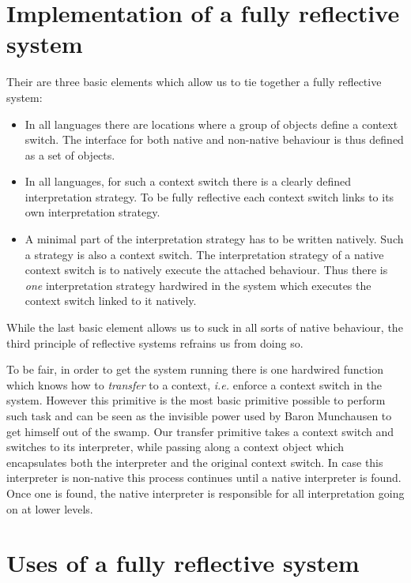 \documentclass{article}
\newcommand{\ie}{\emph{i.e.}\xspace}
\begin{document}
\section{Implementation of a fully reflective system}
Their are three basic elements which allow us to tie together a fully
reflective system:

\begin{itemize}
    \item In all languages there are locations where a group of
          objects define a context switch. The interface for both
          native and non-native behaviour is thus defined as a set of
          objects.
    \item In all languages, for such a context switch there is a
          clearly defined interpretation strategy. To be fully
          reflective each context switch links to its own
          interpretation strategy.
    \item A minimal part of the interpretation strategy has to be
          written natively. Such a strategy is also a context switch.
          The interpretation strategy of a native context switch is to
          natively execute the attached behaviour. Thus there is
          \emph{one} interpretation strategy hardwired in the system
          which executes the context switch linked to it natively.
\end{itemize}

While the last basic element allows us to suck in all sorts of native
behaviour, the third principle of reflective systems refrains us from
doing so. 

To be fair, in order to get the system running there is one hardwired
function which knows how to \emph{transfer} to a context, \ie enforce
a context switch in the system. However this primitive is the most
basic primitive possible to perform such task and can be seen as the
invisible power used by Baron Munchausen to get himself out of the swamp.
Our transfer primitive takes a context switch and switches to its
interpreter, while passing along a context object which encapsulates both
the interpreter and the original context switch. In case this interpreter
is non-native this process continues until a native interpreter is found.
Once one is found, the native interpreter is responsible for all
interpretation going on at lower levels.

\section{Uses of a fully reflective system}
\end{document}

